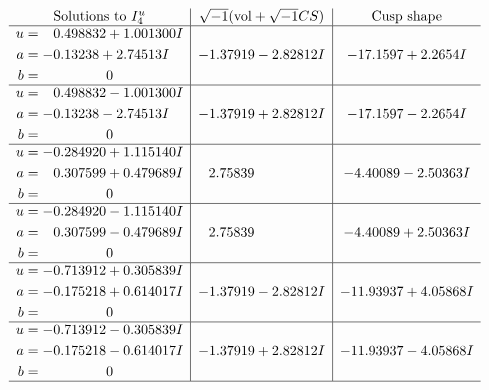 \documentclass[1p]{elsarticle_modified}
\theoremstyle{definition}
\newcommand{\I}{\sqrt{-1}}
\begin{document}
$$\begin{array}{c|c|c}  
\text{Solutions to }I^u_{4}& \I (\text{vol} + \sqrt{-1}CS) & \text{Cusp shape}\\
 \hline 
\begin{aligned}
u &= \phantom{-}0.498832 + 1.001300 I \\
a &= -0.13238 + 2.74513 I \\
b &= \phantom{-0.000000 } 0\end{aligned}
 & -1.37919 - 2.82812 I & -17.1597 + 2.2654 I \\ \hline\begin{aligned}
u &= \phantom{-}0.498832 - 1.001300 I \\
a &= -0.13238 - 2.74513 I \\
b &= \phantom{-0.000000 } 0\end{aligned}
 & -1.37919 + 2.82812 I & -17.1597 - 2.2654 I \\ \hline\begin{aligned}
u &= -0.284920 + 1.115140 I \\
a &= \phantom{-}0.307599 + 0.479689 I \\
b &= \phantom{-0.000000 } 0\end{aligned}
 & \phantom{-}2.75839\phantom{ +0.000000I} & -4.40089 - 2.50363 I \\ \hline\begin{aligned}
u &= -0.284920 - 1.115140 I \\
a &= \phantom{-}0.307599 - 0.479689 I \\
b &= \phantom{-0.000000 } 0\end{aligned}
 & \phantom{-}2.75839\phantom{ +0.000000I} & -4.40089 + 2.50363 I \\ \hline\begin{aligned}
u &= -0.713912 + 0.305839 I \\
a &= -0.175218 + 0.614017 I \\
b &= \phantom{-0.000000 } 0\end{aligned}
 & -1.37919 - 2.82812 I & -11.93937 + 4.05868 I \\ \hline\begin{aligned}
u &= -0.713912 - 0.305839 I \\
a &= -0.175218 - 0.614017 I \\
b &= \phantom{-0.000000 } 0\end{aligned}
 & -1.37919 + 2.82812 I & -11.93937 - 4.05868 I\\
 \hline 
 \end{array}$$\newpage
\newpage\renewcommand{\arraystretch}{1}
\end{document}
